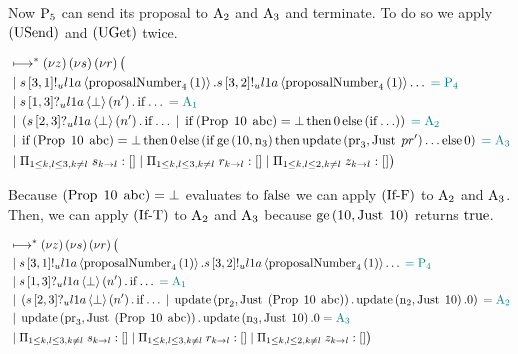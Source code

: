 Now $\Proposer{5}$ can send its proposal to $\Acceptor{2}$ and $\Acceptor{3}$ and terminate.
To do so we apply $\RUsend$ and $\RUget$ twice.

\begin{align*}
&\mapstostar\NuChannels\big (\\
&\Or
\SendUnreliableP{\ChannelS}{3}{1}{\LOneA}{\proposalNumber{1}{4}}.
\SendUnreliableP{\ChannelS}{3}{2}{\LOneA}{\proposalNumber{1}{4}}\ldots
\comment{= \Proposer{4}}\\
&\Or \ReceiveUnreliableP{\ChannelS}{1}{3}{\LOneA}{\bot}{n'}.\If{\ldots} \comment{= \Acceptor{1}}\\
&\Or
    \Paren{
        \ReceiveUnreliableP{\ChannelS}{2}{3}{\LOneA}{\bot}{n'}.\If{\ldots}
        \Or
        \If{\Paren{\ProposalC{10}{\ABC}} = \bot}
        \Then{\End}
        \Else{\Paren{
            \If{\ldots}
        }}
    } \comment{= \Acceptor{2}}\\
&\Or
    \If{\Paren{\ProposalC{10}{\ABC}} = \bot}
    \Then{\End}
    \Else{\Paren{
        \If{\greaterEqual{10}{\NumberRegister_3}}
        \Then{\update{\ProposalRegister_3}{\Just{pr'}}\ldots}
        \Else{\End}
    }}
    \comment{= \Acceptor{3}}\\
&\Or \InnerSessionQueues{\ChannelS}
\Or \InnerSessionQueues{\ChannelR}
\Or \OuterSessionQueues
\big )
\end{align*}

Because $\Paren{\ProposalC{10}{\ABC}} = \bot$ evaluates to $\False$ we can apply $\RIfF$ to $\Acceptor{2}$ and $\Acceptor{3}$.
Then, we can apply $\RIfT$ to $\Acceptor{2}$ and $\Acceptor{3}$ because $\greaterEqual{10}{\Just{10}}$ returns $\True$.

\begin{align*}
&\mapstostar\NuChannels\big (\\
&\Or
\SendUnreliableP{\ChannelS}{3}{1}{\LOneA}{\proposalNumber{1}{4}}.
\SendUnreliableP{\ChannelS}{3}{2}{\LOneA}{\proposalNumber{1}{4}}\ldots
\comment{= \Proposer{4}}\\
&\Or \ReceiveUnreliableP{\ChannelS}{1}{3}{\LOneA}{\bot}{n'}.\If{\ldots} \comment{= \Acceptor{1}}\\
&\Or
    \Paren{
        \ReceiveUnreliableP{\ChannelS}{2}{3}{\LOneA}{\bot}{n'}.\If{\ldots}
        \Or
            \update{\ProposalRegister_2}{\Just{\Paren{\ProposalC{10}{\ABC}}}}.
            \update{\NumberRegister_2}{\Just{10}}.
            \End
    } \comment{= \Acceptor{2}}\\
&\Or
    \update{\ProposalRegister_3}{\Just{\Paren{\ProposalC{10}{\ABC}}}}.
    \update{\NumberRegister_3}{\Just{10}}.
    \End
    \comment{= \Acceptor{3}}\\
&\Or \InnerSessionQueues{\ChannelS}
\Or \InnerSessionQueues{\ChannelR}
\Or \OuterSessionQueues
\big )
\end{align*}

